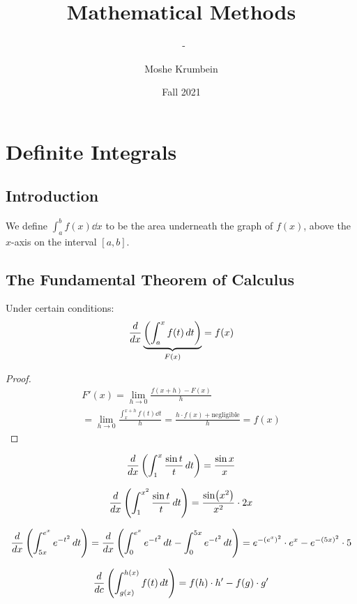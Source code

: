 \documentclass[00_complete]{subfiles}
\title{Mathematical Methods}
\author{Moshe Krumbein}
\date{Fall 2021}
\begin{document}
\setcounter{chapter}{7}

\chapter{Definite Integrals}
\subtitle{\theauthor~- \thedate}

\section{Introduction}

We define $\int_{a}^{b}f(x)\dd{x}$ to be the area underneath the graph of
$f(x)$, above the $x$-axis on the interval $[a,b]$.

\section{The Fundamental Theorem of Calculus}
\begin{definition}
    Under certain conditions:
    $$\dv{x}\underbrace{\left(\int_{a}^{x}f(t)\dd{t}\right)}_{F(x)} = f(x)$$
    \begin{proof}
        $$
        \begin{gathered}
            F'(x)= \lim\limits_{h \to 0} \frac{f(x+h)-F(x)}{h} \\
            = \lim\limits_{h \to 0} \frac{\int_{x}^{x+h}f(t)\dd{t}}{h} =
            \frac{h\cdot f(x) + \text{negligible}}{h} = f(x)
        \end{gathered}
        $$
    \end{proof}
\end{definition}
\begin{example}
    $$
        \dv{x}\left(\int_{1}^{x}\frac{\sin t}{t}\dd{t}\right) = \frac{\sin x}{x}
    $$
\end{example}
\begin{example}
    $$
        \dv{x}\left(\int_{1}^{x^2}\frac{\sin t}{t}\dd{t}\right) = \frac{\sin
        (x^2)}{x^2}\cdot 2x
    $$
\end{example}
\begin{example}
    $$
        \dv{x}\left(\int_{5x}^{e^x} e^{-t^2}\dd{t}\right) =
        \dv{x}\left(\int_{0}^{e^x}e^{-t^2}\dd{t}-\int_{0}^{5x}e^{-t^2}\dd{t}\right)
        = e^{-(e^x)^2}\cdot e^x - e^{-(5x)^2}\cdot 5
    $$
\end{example}
\begin{definition}
    $$\dv{c}\left(\int_{g(x)}^{h(x)}f(t)\dd{t}\right)=f(h)\cdot h'-f(g)\cdot g'$$
\end{definition}
\end{document}

